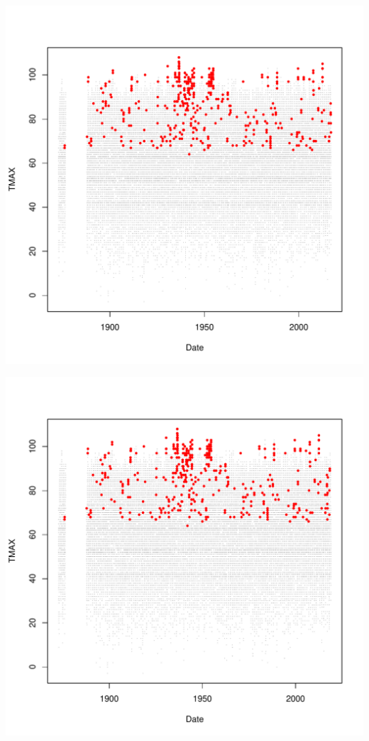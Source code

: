 \documentclass{article}\usepackage[]{graphicx}\usepackage[]{color}
\makeatletter
\def\maxwidth{ %
  \ifdim\Gin@nat@width>\linewidth
    \linewidth
  \else
    \Gin@nat@width
  \fi
}
\newenvironment{knitrout}{}{} %
\makeatother
\begin{document}
\begin{knitrout}
\includegraphics[width=\maxwidth]{figure/unnamed-chunk-4-68} 

\includegraphics[width=\maxwidth]{figure/unnamed-chunk-4-69} 


\end{knitrout}
\end{document}
